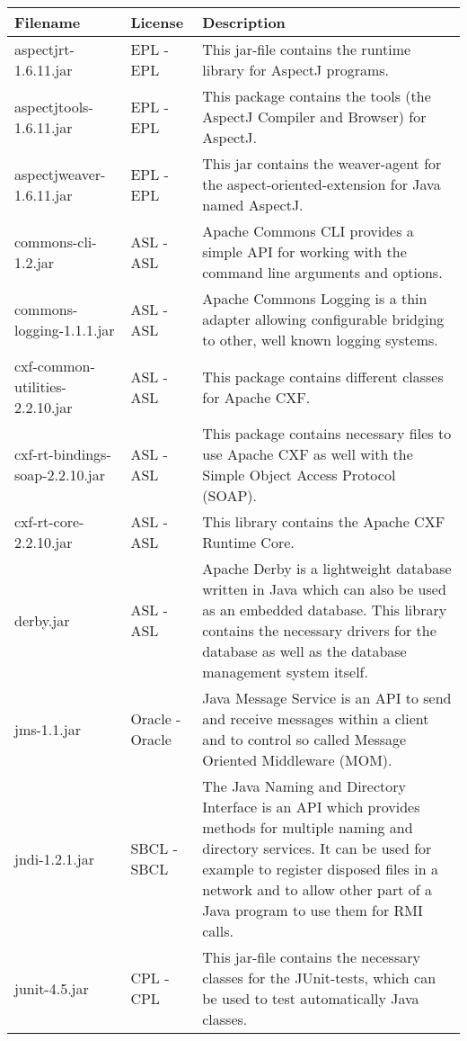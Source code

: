 \begin{center}
\begin{longtable}{|p{}|p{}|p{}|}
\hline 
Filename & License & Description\\
\hline
\hline 
aspectjrt-1.6.11.jar & EPL - EPL & This jar-file contains the runtime library for AspectJ programs.\\
\hline 
aspectjtools-1.6.11.jar & EPL - EPL & This package contains the tools (the AspectJ Compiler and Browser) for AspectJ.\\
\hline 
aspectjweaver-1.6.11.jar & EPL - EPL & This jar contains the weaver-agent for the aspect-oriented-extension for Java named AspectJ.\\
\hline 
commons-cli-1.2.jar & ASL - ASL & Apache Commons CLI provides a simple API for working with the command line arguments and options.\\
\hline 
commons-logging-1.1.1.jar & ASL - ASL & Apache Commons Logging is a thin adapter allowing configurable bridging to other, well known logging systems.\\
\hline 
cxf-common-utilities-2.2.10.jar & ASL - ASL & This package contains different classes for Apache CXF.\\
\hline 
cxf-rt-bindings-soap-2.2.10.jar & ASL - ASL & This package contains necessary files to use Apache CXF as well with the Simple Object Access Protocol (SOAP).\\
\hline 
cxf-rt-core-2.2.10.jar & ASL - ASL & This library contains the Apache CXF Runtime Core.\\
\hline 
derby.jar & ASL - ASL & Apache Derby is a lightweight database written in Java which can also be used as an embedded database. This library contains the necessary drivers for the database as well as the database management system itself.\\
\hline 
jms-1.1.jar & Oracle - Oracle & Java Message Service is an API to send and receive messages within a client and to control so called Message Oriented Middleware (MOM).\\
\hline 
jndi-1.2.1.jar & SBCL - SBCL & The Java Naming and Directory Interface is an API which provides methods for multiple naming and directory services. It can be used for example to register disposed files in a network and to allow other part of a Java program to use them for RMI calls.\\
\hline 
junit-4.5.jar & CPL - CPL & This jar-file contains the necessary classes for the JUnit-tests, which can be used to test automatically Java classes.\\

\end{longtable}
\end{center}
